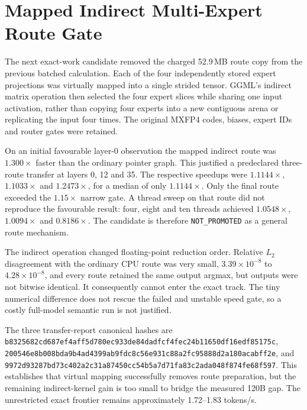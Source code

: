 \section{Mapped Indirect Multi-Expert Route Gate}

The next exact-work candidate removed the charged 52.9\,MB route copy from the
previous batched calculation.  Each of the four independently stored expert
projections was virtually mapped into a single strided tensor.  GGML's indirect
matrix operation then selected the four expert slices while sharing one input
activation, rather than copying four experts into a new contiguous arena or
replicating the input four times.  The original MXFP4 codes, biases, expert IDs
and router gates were retained.

On an initial favourable layer-0 observation the mapped indirect route was
$1.300\times$ faster than the ordinary pointer graph.  This justified a
predeclared three-route transfer at layers 0, 12 and 35.  The respective
speedups were $1.1144\times$, $1.1033\times$ and $1.2473\times$, for a median
of only $1.1144\times$.  Only the final route exceeded the $1.15\times$ narrow
gate.  A thread sweep on that route did not reproduce the favourable result:
four, eight and ten threads achieved $1.0548\times$, $1.0094\times$ and
$0.8186\times$.  The candidate is therefore
\texttt{NOT\_PROMOTED} as a general route mechanism.

The indirect operation changed floating-point reduction order.  Relative
$L_2$ disagreement with the ordinary CPU route was very small,
$3.39\times10^{-8}$ to $4.28\times10^{-8}$, and every route retained the same
output argmax, but outputs were not bitwise identical.  It consequently cannot
enter the exact track.  The tiny numerical difference does not rescue the
failed and unstable speed gate, so a costly full-model semantic run is not
justified.

The three transfer-report canonical hashes are
\texttt{b8325682cd687ef4aff5d780ec933de84dadfcf4fec24b11650df16edf85175c},
\texttt{200546e8b008bda9b4ad4399ab9fdc8c56e931c88a2fc95888d2a180acabff2e},
and
\texttt{9972d93287bd73c402a2c31a87450cc54b5a7d71fa83c2ada048f874fe68f597}.
This establishes that virtual mapping successfully removes route preparation,
but the remaining indirect-kernel gain is too small to bridge the measured
120B gap.  The unrestricted exact frontier remains approximately
1.72--1.83 tokens/s.
